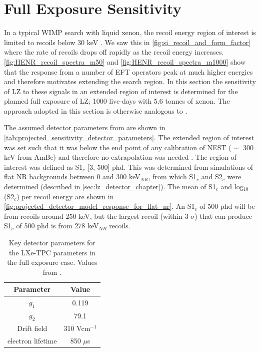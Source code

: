 \section{Full Exposure Sensitivity}
\par
In a typical WIMP search with liquid xenon, the recoil energy region of interest is limited to recoils below 30 keV \cite{LZ_TechnicalDesignReview_ref, LZ_projected_sensitivity_paper_ref, xenonnt_projected_sensitivty_ref}.
We saw this in \autoref{fig:si_recoil_and_form_factor} where the rate of recoils drops off rapidly as the recoil energy increases.
\autoref{fig:HENR_recoil_spectra_m50} and \autoref{fig:HENR_recoil_spectra_m1000} show that the response from a number of EFT operators peak at much higher energies and therefore motivates extending the search region.
In this section the sensitivity of LZ to these signals in an extended region of interest is determined for the planned full exposure of LZ; 1000 live-days with 5.6 tonnes of xenon.
The approach adopted in this section is otherwise analogous to \cite{LZ_projected_sensitivity_paper_ref}.
\par
The assumed detector parameters from \cite{LZ_projected_sensitivity_paper_ref} are shown in \autoref{tab:projected_sensitivity_detector_parameters}.
The extended region of interest was set such that it was below the end point of any calibration of NEST ($\backsim$ 300 keV from AmBe) and therefore no extrapolation was needed \cite{nest_1_ref}.
The region of interest was defined as S1$_c$ [3, 500] phd.
This was determined from simulations of flat NR backgrounds between 0 and 300 keV$_{NR}$, from which S1$_c$ and S2$_c$ were determined (described in \autoref{sec:lz_detector_chapter}).
The mean of S1$_c$ and log$_{10}$(S2$_c$) per recoil energy are shown in \autoref{fig:projected_detector_model_response_for_flat_nr}.
An S1$_c$ of 500 phd will be from recoils around 250 keV, but the largest recoil (within 3 $\sigma$) that can produce S1$_c$ of 500 phd is from 278 keV$_{NR}$ recoils.

\begin{table}[]
    \centering
    \begin{tabular}{c|c}
        Parameter   & Value  \\ \hline
        $g_{1}$     & 0.119 \\
        $g_{2}$     & 79.1  \\
        Drift field & 310 Vcm$^{-1}$ \\
        electron lifetime & 850 $\mu$s
    \end{tabular}
    \caption{Key detector parameters for the LXe-TPC parameters in the full exposure case. 
             Values from \cite{LZ_projected_sensitivity_paper_ref}.}
    \label{tab:projected_sensitivity_detector_parameters}
\end{table}

